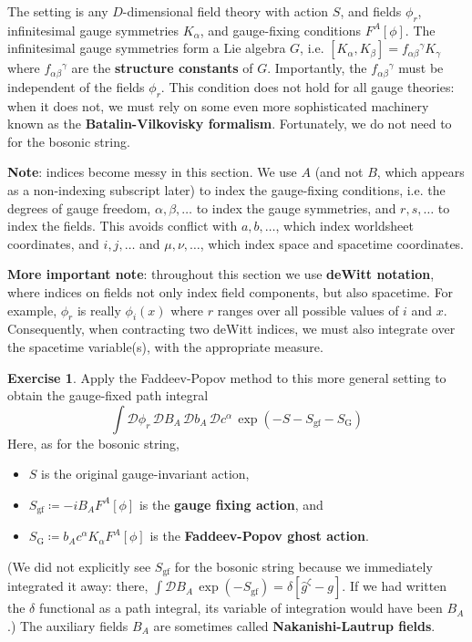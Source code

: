 \documentclass{report}
\theoremstyle{plain}
\theoremstyle{definition}
\newtheorem{exercise}{Exercise}[section]
\theoremstyle{remark}
\newcommand{\cD}{\mathcal{D}}
\begin{document}
The setting is any $D$-dimensional field theory with action $S$, and
fields $\phi_r$, infinitesimal gauge symmetries $K_\alpha$, and
gauge-fixing conditions $F^A[\phi]$. The infinitesimal gauge
symmetries form a Lie algebra $G$, i.e. $[K_\alpha, K_\beta] =
f_{\alpha\beta}{}^\gamma K_\gamma$ where $f_{\alpha\beta}{}^\gamma$
are the {\bf structure constants} of $G$. Importantly, the
$f_{\alpha\beta}{}^\gamma$ must be independent of the fields $\phi_r$.
This condition does not hold for all gauge theories: when it does not,
we must rely on some even more sophisticated machinery known as the
{\bf Batalin-Vilkovisky formalism}. Fortunately, we do not need to for
the bosonic string.

{\bf Note}: indices become messy in this section. We use $A$ (and not
$B$, which appears as a non-indexing subscript later) to index the
gauge-fixing conditions, i.e. the degrees of gauge freedom, $\alpha,
\beta, \ldots$ to index the gauge symmetries, and $r, s, \ldots$ to
index the fields. This avoids conflict with $a, b, \ldots$, which
index worldsheet coordinates, and $i, j, \ldots$ and $\mu, \nu,
\ldots$, which index space and spacetime coordinates.

{\bf More important note}: throughout this section we use {\bf deWitt
  notation}, where indices on fields not only index field components,
but also spacetime. For example, $\phi_r$ is really $\phi_i(x)$ where
$r$ ranges over all possible values of $i$ and $x$. Consequently, when
contracting two deWitt indices, we must also integrate over the
spacetime variable(s), with the appropriate measure.

\begin{exercise}
  Apply the Faddeev-Popov method to this more general setting to
  obtain the gauge-fixed path integral
  \[ \int \cD \phi_r \, \cD B_A \, \cD b_A \, \cD c^\alpha \, \exp(-S - S_{\text{gf}} - S_{\text{G}}) \]
  Here, as for the bosonic string,
  \begin{itemize}
  \item $S$ is the original gauge-invariant action,
  \item $S_{\text{gf}} \coloneqq -i B_A F^A[\phi]$ is the {\bf gauge
    fixing action}, and
  \item $S_{\text{G}} \coloneqq b_A c^\alpha K_\alpha F^A[\phi]$ is
    the {\bf Faddeev-Popov ghost action}.
  \end{itemize}
  (We did not explicitly see $S_{\text{gf}}$ for the bosonic string
  because we immediately integrated it away: there, $\int \cD B_A \,
  \exp(-S_{\text{gf}}) = \delta[\hat{g}^\zeta - g]$. If we had written
  the $\delta$ functional as a path integral, its variable of
  integration would have been $B_A$.) The auxiliary fields $B_A$ are
  sometimes called {\bf Nakanishi-Lautrup fields}.
\end{exercise}
\end{document}
